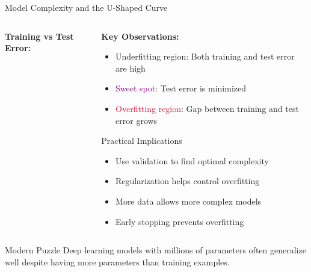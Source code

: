 \documentclass[aspectratio=169,11pt]{beamer}
\begin{document}
\begin{frame}{Model Complexity and the U-Shaped Curve}
\begin{columns}
\begin{column}{0.5\textwidth}
\textbf{Training vs Test Error:}

\begin{figure}
\centering
{}
\end{figure}
\end{column}
\begin{column}{0.5\textwidth}
\textbf{Key Observations:}

\begin{itemize}
\item \textcolor{forest}{Underfitting region}: Both training and test error are high
\item \textcolor{purple}{Sweet spot}: Test error is minimized
\item \textcolor{crimson}{Overfitting region}: Gap between training and test error grows
\end{itemize}

\vspace{0.3cm}
\begin{block}{Practical Implications}
\begin{itemize}
\item Use validation to find optimal complexity
\item Regularization helps control overfitting
\item More data allows more complex models
\item Early stopping prevents overfitting
\end{itemize}
\end{block}
\end{column}
\end{columns}

\vspace{0.3cm}
\begin{alertblock}{Modern Puzzle}
Deep learning models with millions of parameters often generalize well despite having more parameters than training examples.
\end{alertblock}
\end{frame}
\end{document}
